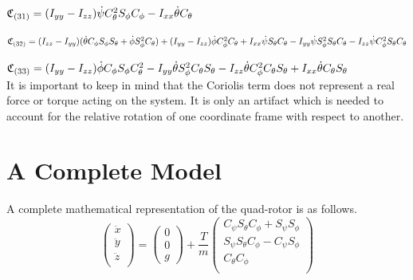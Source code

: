 $\mathfrak{C}_{(31)} = (I_{yy}-I_{zz}) \dot{\psi} C_{\theta}^2 S_{\phi} C_{\phi} - I_{xx} \dot{\theta} C_{\theta}$


$\mathfrak{C}_{(32)}  = (I_{zz}-I_{yy}) ( \dot{\theta} C_{\phi} S_{\phi} S_{\theta} + \dot{\phi} S_{\phi}^2 C_{\theta} ) + (I_{yy}-I_{zz}) \dot{\phi} C_{\phi}^2 C_{\theta} + I_{xx}  \dot{\psi} S_{\theta} C_{\theta} - I_{yy}  \dot{\psi} S_{\phi}^2 S_{\theta} C_{\theta} - I_{zz}  \dot{\psi} C_{\phi}^2 S_{\theta} C_{\theta}$


$\mathfrak{C}_{(33)} = (I_{yy}-I_{zz})   \dot{\phi}  C_{\phi} S_{\phi} C_{\theta}^2 - I_{yy}   \dot{\theta} S_{\phi}^2 C_{\theta} S_{\theta} - I_{zz} \dot{\theta} C_{\phi}^2 C_{\theta} S_{\theta} + I_{xx} \dot{\theta} C_{\theta} S_{\theta}$\\



 
 It is important to keep in mind that the Coriolis term does not represent a real force or torque acting on the system. It is only an artifact which is needed to account for the relative rotation of one coordinate frame with respect to another.   






\section {A Complete Model}


A complete mathematical representation of the quad-rotor is as follows.\\ 

\begin{equation}
    \label{lineareq}
    \left(
        \begin{array}{c}
           \ddot{x}\\
           \ddot{y}\\
           \ddot{z}\\
        \end{array}
    \right)
    = \left(
       \begin{array}{c}
        0\\
        0\\
        g  
      \end{array}
    \right)
    +\frac{T}{m}
     \left(
        \begin{array}{c}
             C_{\psi}S_{\theta}C_{\phi} + S_{\psi}S_{\phi} \\
             S_{\psi}S_{\theta}C_{\phi} - C_{\psi}S_{\phi} \\
             C_{\theta} C_{\phi} \\
        \end{array}
    \right)
\end{equation}

